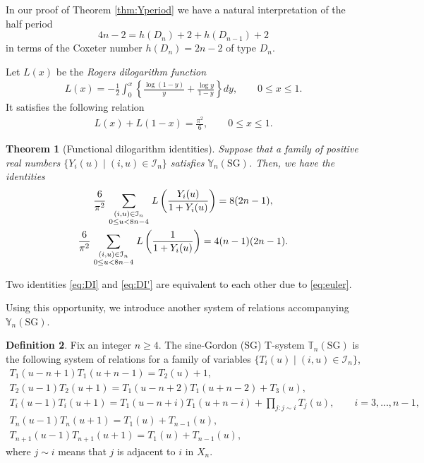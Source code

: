 \documentclass[11pt]{article}
\numberwithin{equation}{section}
\newtheorem{Theorem}{Theorem}[section]
\theoremstyle{definition}
\newtheorem{Definition}[Theorem]{Definition}
\begin{document}
In our proof of Theorem \ref{thm:Yperiod}
we have  a natural interpretation
of the  half period
\[
4n-2=h(D_n)+2+h(D_{n-1})+2
\]
in terms of the Coxeter number  $h(D_n)=2n-2$ of type $D_n$.

Let $L(x)$ be the {\em Rogers dilogarithm function\/}
 \cite{Lewin81}
\begin{gather*}
L(x)=-\frac{1}{2}\int_{0}^x
\left\{ \frac{\log(1-y)}{y}+
\frac{\log y}{1-y}
\right\} dy,
\qquad 0\leq x\leq 1.
\end{gather*}
It satisf\/ies the following relation
\begin{gather}
\label{eq:euler}
L(x)+L(1-x)=\frac{\pi^2}{6},
\qquad 0\leq x\leq 1.
\end{gather}

\begin{Theorem}[Functional dilogarithm identities]
\label{thm:dilog}
Suppose that a family of positive real numbers
$\{ Y_i(u) \mid (i,u)\in \mathcal{I}_n\}$ satisfies
$\mathbb{Y}_n(\mathrm{SG})$.
Then, we have the identities
\begin{gather}
\label{eq:DI}
\frac{6}{\pi^2}
\sum_{
\genfrac{}{}{0pt}{1}
{
(i,u)\in \mathcal{I}_{n}
}
{
0\leq u < 8n-4
}
}
L\left(
\frac{Y_i(u)}{1+Y_i(u)}
\right)
 =8(2n-1),\\
\label{eq:DI'}
\frac{6}{\pi^2}
\sum_{
\genfrac{}{}{0pt}{1}
{
(i,u)\in \mathcal{I}_{n}
}
{
0\leq u < 8n-4
}
}
L\left(
\frac{1}{1+Y_i(u)}
\right)
 =4(n-1)(2n-1).
\end{gather}
\end{Theorem}
Two identities
\eqref{eq:DI} and \eqref{eq:DI'}
are equivalent to each other due to \eqref{eq:euler}.


Using this opportunity, we introduce
another system of relations
 accompanying  $\mathbb{Y}_{n}(\mathrm{SG})$.
\begin{Definition}
Fix an integer $n \geq 4$.
The sine-Gordon (SG)
T-system $\mathbb{T}_{n}(\mathrm{SG})$
is the following system of relations for
a family of variables
 $\{T_i(u) \mid (i,u)\in \mathcal{I}_n \}$,
\begin{gather}
T_1\left(u-n+1\right)
T_1\left(u+n-1\right)
=
T_2(u)+1,\nonumber\\
T_2(u-1) T_2(u+1)
=
T_1(u-n+2)T_1(u+n-2)+T_3(u),
\nonumber\\
T_i(u-1)T_i(u+1)
=
T_1(u-n+i)T_1(u+n-i)
+ \prod_{j:j\sim i} T_j(u),
\qquad i=3,\dots,n-1,
\nonumber\\
T_{n}(u-1)T_{n}(u+1)
=
T_1(u) + T_{n-1}(u),
\nonumber\\
T_{n+1}(u-1)T_{n+1}(u+1)
=
T_1(u) + T_{n-1}(u),\label{eq:T1}
\end{gather}
where $j\sim i$ means that $j$ is adjacent to $i$ in $X_n$.
\end{Definition}
\end{document}
